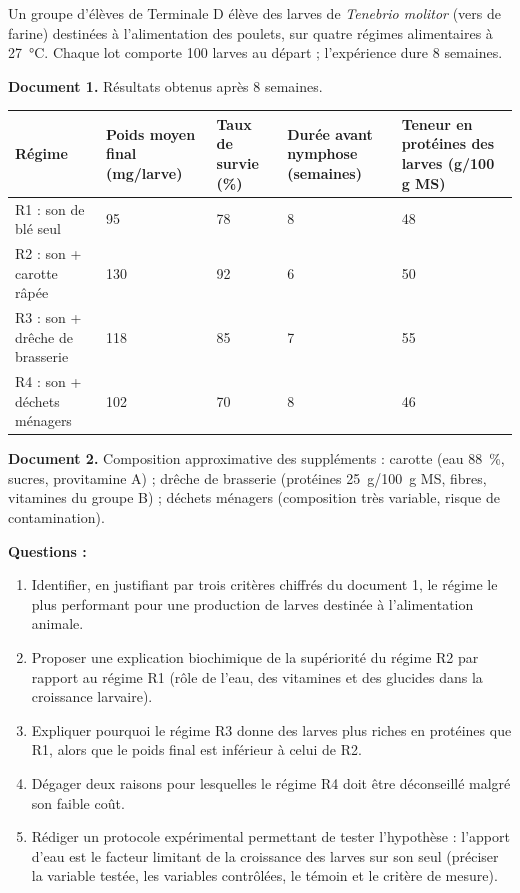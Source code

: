 \documentclass[11pt]{article}
\begin{document}
\begin{exercice}
Un groupe d'élèves de Terminale D élève des larves de \emph{Tenebrio molitor} (vers de farine) destinées à l'alimentation des poulets, sur quatre régimes alimentaires à \SI{27}{\celsius}. Chaque lot comporte 100 larves au départ ; l'expérience dure 8 semaines.

\textbf{Document 1.} Résultats obtenus après 8 semaines.
\begin{center}
\begin{tabularx}{\linewidth}{|l|X|X|X|X|}\hline
\rowcolor{popblueL} \textbf{Régime} & \textbf{Poids moyen final (mg/larve)} & \textbf{Taux de survie (\%)} & \textbf{Durée avant nymphose (semaines)} & \textbf{Teneur en protéines des larves (g/100 g MS)} \\ \hline
R1 : son de blé seul & 95 & 78 & 8 & 48 \\ \hline
R2 : son + carotte râpée & 130 & 92 & 6 & 50 \\ \hline
R3 : son + drêche de brasserie & 118 & 85 & 7 & 55 \\ \hline
R4 : son + déchets ménagers & 102 & 70 & 8 & 46 \\ \hline
\end{tabularx}
\end{center}
\textbf{Document 2.} Composition approximative des suppléments : carotte (eau \SI{88}{\percent}, sucres, provitamine A) ; drêche de brasserie (protéines \SI{25}{g/100 g} MS, fibres, vitamines du groupe B) ; déchets ménagers (composition très variable, risque de contamination).

\textbf{Questions :}
\begin{enumerate}
\item Identifier, en justifiant par trois critères chiffrés du document 1, le régime le plus performant pour une production de larves destinée à l'alimentation animale.
\item Proposer une explication biochimique de la supériorité du régime R2 par rapport au régime R1 (rôle de l'eau, des vitamines et des glucides dans la croissance larvaire).
\item Expliquer pourquoi le régime R3 donne des larves plus riches en protéines que R1, alors que le poids final est inférieur à celui de R2.
\item Dégager deux raisons pour lesquelles le régime R4 doit être déconseillé malgré son faible coût.
\item Rédiger un protocole expérimental permettant de tester l'hypothèse : \og l'apport d'eau est le facteur limitant de la croissance des larves sur son seul \fg{} (préciser la variable testée, les variables contrôlées, le témoin et le critère de mesure).
\end{enumerate}
\end{exercice}
\end{document}
